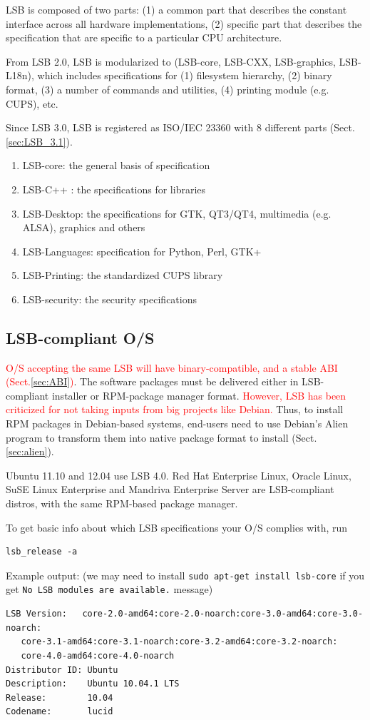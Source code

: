 LSB is composed of two parts: (1) a common part that describes the constant
interface across all hardware implementations, (2) specific part that describes
the specification that are specific to a particular CPU architecture. 

From LSB 2.0, LSB is modularized to (LSB-core, LSB-CXX, LSB-graphics, LSB-L18n),
which includes specifications for (1) filesystem hierarchy, (2) binary format,
(3) a number of commands and utilities, (4) printing module (e.g.
CUPS), etc. 

Since LSB 3.0, LSB is registered as ISO/IEC 23360 with 8 different parts
(Sect.\ref{sec:LSB_3.1}).
\begin{enumerate}
  \item LSB-core: the general basis of specification
  \item LSB-C++ : the specifications for libraries
  \item LSB-Desktop: the specifications for GTK, QT3/QT4, multimedia (e.g.
  ALSA), graphics and others
  \item LSB-Languages: specification for Python, Perl, GTK+
  \item LSB-Printing: the standardized CUPS library
  \item LSB-security: the security specifications
\end{enumerate}

\subsection{LSB-compliant O/S}
\label{sec:LSB-compliant-OSes}

\textcolor{red}{O/S accepting the same LSB will have binary-compatible, and a
stable ABI (Sect.\ref{sec:ABI})}. The software packages must be
delivered either in LSB-compliant installer or RPM-package manager format.
\textcolor{red}{However, LSB has been criticized for not taking inputs from big
projects like Debian.} Thus, to install RPM packages in Debian-based systems,
end-users need to use Debian's Alien program to transform them into native
package format to install (Sect.\ref{sec:alien}).

Ubuntu 11.10 and 12.04 use LSB 4.0.  Red Hat Enterprise Linux, Oracle Linux,
SuSE Linux Enterprise and Mandriva Enterprise Server are LSB-compliant distros,
with the same RPM-based package manager.

To get basic info about which LSB specifications your O/S complies with, run 
\begin{verbatim}
lsb_release -a
\end{verbatim}
Example output: (we may need to install \verb!sudo apt-get install lsb-core! if
you get \verb!No LSB modules are available.! message)
\begin{verbatim}
LSB Version:   core-2.0-amd64:core-2.0-noarch:core-3.0-amd64:core-3.0-noarch:
   core-3.1-amd64:core-3.1-noarch:core-3.2-amd64:core-3.2-noarch:
   core-4.0-amd64:core-4.0-noarch
Distributor ID: Ubuntu
Description:    Ubuntu 10.04.1 LTS
Release:        10.04
Codename:       lucid
\end{verbatim}
 
